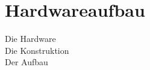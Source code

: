 \section{Hardwareaufbau}
\begin{Spacing}{\mylinespace}

Die Hardware \\
Die Konstruktion\\
Der Aufbau

\end{Spacing}
\newpage
\clearpage
